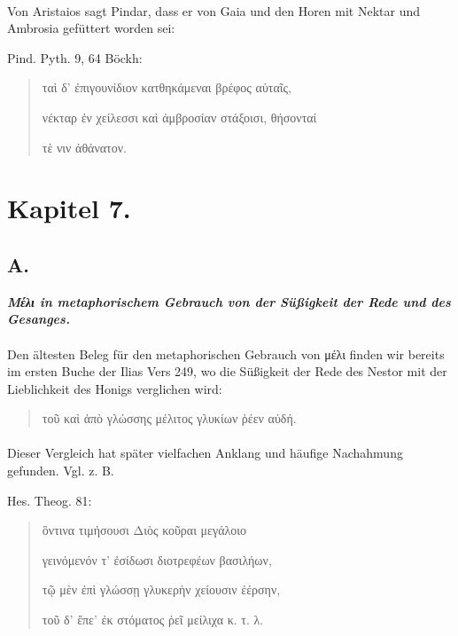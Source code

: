 \documentclass[a4paper, 11pt, oneside]{article}
\begin{document}
\paragraph{}
Von Aristaios sagt Pindar, dass er von Gaia und den Horen mit Nektar und Ambrosia gefüttert worden sei:

Pind. Pyth. 9, 64 Böckh:
\begin{quotation}
ταὶ δ' ἐπιγουνίδιον κατθηκάμεναι βρέφος αὑταῖς,

νέκταρ ἐν χείλεσσι καὶ ἀμβροσίαν στάξοισι, θήσονταί

τὲ νιν ἀθάνατον.
\end{quotation}
\paragraph{}
\clearpage
\section{Kapitel 7.}
\subsection{A.}
\begin{center}
\textbf{\emph{Μέλι in metaphorischem Gebrauch von der Süßigkeit der Rede und des Gesanges.}}
\end{center}
\paragraph{}
Den ältesten Beleg für den metaphorischen Gebrauch von μέλι finden wir bereits im ersten Buche der Ilias Vers 249, wo die Süßigkeit der Rede des Nestor mit der Lieblichkeit des Honigs verglichen wird:
\begin{quotation}
τοῦ καὶ ἀπὸ γλώσσης μέλιτος γλυκίων ῥέεν αὐδή.
\end{quotation}
\paragraph{}
Dieser Vergleich hat später vielfachen Anklang und häufige Nachahmung gefunden. Vgl. z. B.

Hes. Theog. 81:
\begin{quotation}
ὃντινα τιμήσουσι Διὸς κοῦραι μεγάλοιο

γεινόμενόν τ' ἐσίδωσι διοτρεφέων βασιλήων,

τῷ μὲν ἐπὶ γλώσσῃ γλυκερὴν χείουσιν ἐέρσην,

τοῦ δ' ἔπε' ἐκ στόματος ῥεῖ μείλιχα κ. τ. λ.
\end{quotation}
\end{document}

